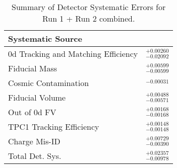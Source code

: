 \begin{table}[here]
\centering
\begin{tabular}{lc}\toprule\midrule
\renewcommand{\arraystretch}{1.1}
Systematic Source &  
\\ \midrule
\p0d Tracking and Matching Efficiency & $^{+0.00260}_{-0.02092}$  \\
\midrule
Fiducial Mass & $^{+0.00599}_{-0.00599}$ \\
\midrule
Cosmic Contamination & $_{-0.00031}$ \\
\midrule
Fiducial Volume & $^{+0.00488}_{-0.00571}$ \\
\midrule
Out of \p0d FV & $^{+0.00168}_{-0.00168}$  \\
\midrule
TPC1 Tracking Efficiency & $^{+0.00148}_{-0.00148}$  \\
\midrule
Charge Mis-ID & $^{+0.00729}_{-0.00390} $  \\ %
\midrule
\midrule
Total Det. Sys. & {\color{red} $^{+0.02357}_{-0.00978} $ }  \\
\midrule
\bottomrule
\end{tabular}
\caption{Summary of Detector Systematic Errors for Run 1 + Run 2 combined.}
\label{tab:SysSum1}
\end{table}
